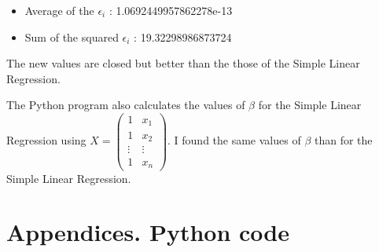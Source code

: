 \documentclass[
	12pt, %
]{article}
\theoremstyle{definition}
\begin{document}
\begin{itemize}
    \item Average of the $\epsilon_i$ : 1.0692449957862278e-13
    \item Sum of the squared $\epsilon_i$ : 19.32298986873724
\end{itemize}
\bigskip
The new values are closed but better than the those of the Simple Linear Regression.



\bigskip
The Python program also calculates the values of $\beta$ for the Simple Linear Regression using $X = \begin{pmatrix} 1 & x_1 \\ 1 & x_2 \\ \vdots & \vdots \\ 1 & x_n  \end{pmatrix}$. I found the same values of $\beta$ than for the Simple Linear Regression.

\pagebreak
\section{Appendices. Python code}
\end{document}
